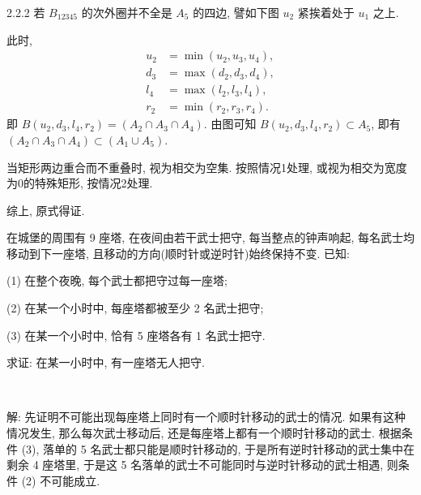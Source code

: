 2.2.2 若 $B_{12345}$ 的次外圈并不全是 $A_5$ 的四边, 譬如下图 $u_2$ 紧挨着处于 $u_1$ 之上.
\begin{figure*}[htbp]
\centering
{}
\end{figure*}

\noindent 此时, 
\begin{align*}
u_2 &= \min(u_2, u_3, u_4), \\
d_3 &= \max(d_2, d_3, d_4), \\
l_4 &= \max(l_2, l_3, l_4), \\
r_2 &= \min(r_2, r_3, r_4).
\end{align*}
即 $B(u_2, d_3, l_4, r_2) = (A_2\cap A_3\cap A_4)$. 由图可知 $B(u_2, d_3, l_4, r_2)\subset A_5$, 即有 $(A_2\cap A_3\cap A_4) \subset (A_1\cup A_5)$.

当矩形两边重合而不重叠时, 视为相交为空集. 按照情况1处理, 或视为相交为宽度为0的特殊矩形, 按情况2处理.

综上, 原式得证.


\newpage
在城堡的周围有 9 座塔, 在夜间由若干武士把守, 每当整点的钟声响起, 每名武士均移动到下一座塔, 且移动的方向(顺时针或逆时针)始终保持不变. 已知: 

(1) 在整个夜晚, 每个武士都把守过每一座塔; 

(2) 在某一个小时中, 每座塔都被至少 2 名武士把守;

(3) 在某一个小时中, 恰有 5 座塔各有 1 名武士把守.

求证: 在某一小时中, 有一座塔无人把守.

~

解: 先证明不可能出现每座塔上同时有一个顺时针移动的武士的情况. 如果有这种情况发生, 那么每次武士移动后, 还是每座塔上都有一个顺时针移动的武士. 根据条件 (3), 落单的 5 名武士都只能是顺时针移动的, 于是所有逆时针移动的武士集中在剩余 4 座塔里, 于是这 5 名落单的武士不可能同时与逆时针移动的武士相遇, 则条件 (2) 不可能成立.

